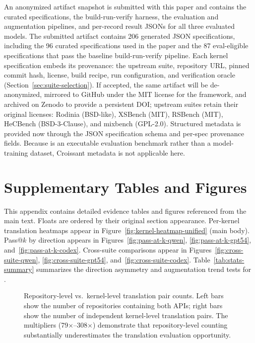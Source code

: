 An anonymized artifact snapshot is submitted with this paper and contains the curated \parbench{} specifications, the build-run-verify harness, the evaluation and augmentation pipelines, and per-record result JSONs for all three evaluated models. The submitted artifact contains 206 generated JSON specifications, including the 96 curated specifications used in the paper and the 87 eval-eligible specifications that pass the baseline build-run-verify pipeline. Each kernel specification embeds its provenance: the upstream suite, repository URL, pinned commit hash, license, build recipe, run configuration, and verification oracle (Section~\ref{sec:suite-selection}). If accepted, the same artifact will be de-anonymized, mirrored to GitHub under the MIT license for the \parbench{} framework, and archived on Zenodo to provide a persistent DOI; upstream suites retain their original licenses: Rodinia (BSD-like), XSBench (MIT), RSBench (MIT), HeCBench (BSD-3-Clause), and mixbench (GPL-2.0). Structured metadata is provided now through the JSON specification schema and per-spec provenance fields. Because \parbench{} is an executable evaluation benchmark rather than a model-training dataset, Croissant metadata is not applicable here.





\section{Supplementary Tables and Figures}
\label{sec:appendix-f}

This appendix contains detailed evidence tables and figures referenced from the main text. Floats are ordered by their original section appearance.
Per-kernel translation heatmaps appear in Figure~\ref{fig:kernel-heatmap-unified} (main body). Pass@$k$ by direction appears in Figures~\ref{fig:pass-at-k-qwen}, \ref{fig:pass-at-k-gpt54}, and~\ref{fig:pass-at-k-codex}. Cross-suite comparisons appear in Figures~\ref{fig:cross-suite-qwen}, \ref{fig:cross-suite-gpt54}, and~\ref{fig:cross-suite-codex}. Table~\ref{tab:stats-summary} summarizes the direction asymmetry and augmentation trend tests for \qwenshort{}.


\begin{figure}[htbp]
\centering

\caption{Repository-level vs.\ kernel-level translation pair counts. Left bars show the number of repositories containing both APIs; right bars show the number of independent kernel-level translation pairs. The multipliers (79$\times$--308$\times$) demonstrate that repository-level counting substantially underestimates the translation evaluation opportunity.}
\label{fig:repo-vs-kernel}
\end{figure}


